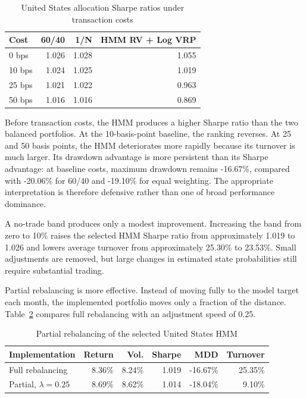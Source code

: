 \begin{table}[htbp]
\centering
\small
\caption{United States allocation Sharpe ratios under transaction costs}
\label{tab:allocation_cost_robustness}
\begin{tabular}{lrrr}
\toprule
Cost
& 60/40
& 1/N
& HMM RV + Log VRP \\
\midrule
0 bps
& 1.026
& 1.028
& 1.055 \\
10 bps
& 1.024
& 1.025
& 1.019 \\
25 bps
& 1.021
& 1.022
& 0.963 \\
50 bps
& 1.016
& 1.016
& 0.869 \\
\bottomrule
\end{tabular}
\end{table}

Before transaction costs, the HMM produces a higher Sharpe ratio than the two balanced portfolios. At the 10-basis-point baseline, the ranking reverses. At 25 and 50 basis points, the HMM deteriorates more rapidly because its turnover is much larger. Its drawdown advantage is more persistent than its Sharpe advantage: at baseline costs, maximum drawdown remains -16.67\%, compared with -20.06\% for 60/40 and -19.10\% for equal weighting. The appropriate interpretation is therefore defensive rather than one of broad performance dominance.

A no-trade band produces only a modest improvement. Increasing the band from zero to 10\% raises the selected HMM Sharpe ratio from approximately 1.019 to 1.026 and lowers average turnover from approximately 25.30\% to 23.53\%. Small adjustments are removed, but large changes in estimated state probabilities still require substantial trading.

Partial rebalancing is more effective. Instead of moving fully to the model target each month, the implemented portfolio moves only a fraction of the distance. Table~\ref{tab:partial_rebalancing} compares full rebalancing with an adjustment speed of 0.25.

\begin{table}[htbp]
\centering
\small
\caption{Partial rebalancing of the selected United States HMM}
\label{tab:partial_rebalancing}
\begin{tabularx}{\textwidth}{Xrrrrr}
\toprule
Implementation
& Return
& Vol.
& Sharpe
& MDD
& Turnover \\
\midrule
Full rebalancing
& 8.36\%
& 8.24\%
& 1.019
& -16.67\%
& 25.35\% \\
Partial, $\lambda=0.25$
& 8.69\%
& 8.62\%
& 1.014
& -18.04\%
& 9.10\% \\
\bottomrule
\end{tabularx}
\end{table}

